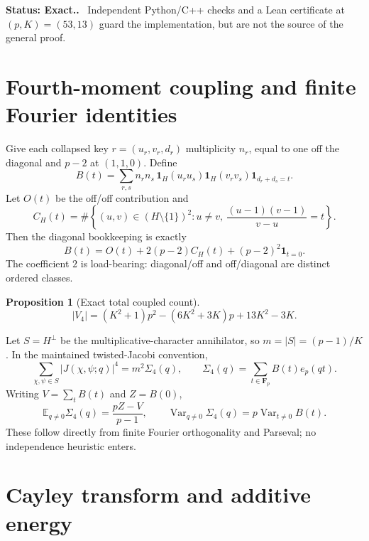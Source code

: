 \documentclass[11pt]{article}
\newtheorem{proposition}[theorem]{Proposition}
\newcommand{\Fp}{\mathbf F_p}
\newcommand{\Status}[1]{\par\smallskip\noindent\textbf{Status: #1.}\ }
\begin{document}
\Status{Exact.}  Independent Python/C++ checks and a Lean certificate at
$(p,K)=(53,13)$ guard the implementation, but are not the source of the general
proof.

\section{Fourth-moment coupling and finite Fourier identities}

Give each collapsed key $r=(u_r,v_r,d_r)$ multiplicity $n_r$, equal to one off
the diagonal and $p-2$ at $(1,1,0)$.  Define
\begin{equation}\label{eq:Bdef}
B(t)=\sum_{r,s}n_rn_s\,
\mathbf 1_H(u_ru_s)\mathbf 1_H(v_rv_s)\mathbf 1_{d_r+d_s=t}.
\end{equation}
Let $O(t)$ be the off/off contribution and
\[
C_H(t)=\#\left\{(u,v)\in(H\setminus\{1\})^2:
 u\ne v,\ \frac{(u-1)(v-1)}{v-u}=t\right\}.
\]
Then the diagonal bookkeeping is exactly
\begin{equation}\label{eq:Bdecomp}
B(t)=O(t)+2(p-2)C_H(t)+(p-2)^2\mathbf 1_{t=0}.
\end{equation}
The coefficient $2$ is load-bearing: diagonal/off and off/diagonal are distinct
ordered classes.

\begin{proposition}[Exact total coupled count]\label{prop:v4}
\[
|V_4|=(K^2+1)p^2-(6K^2+3K)p+13K^2-3K.
\]
\end{proposition}

Let $S=H^\perp$ be the multiplicative-character annihilator, so
$m=|S|=(p-1)/K$.  In the maintained twisted-Jacobi convention,
\begin{equation}\label{eq:fourier}
\sum_{\chi,\psi\in S}|J(\chi,\psi;q)|^4=m^2\Sigma_4(q),
\qquad
\Sigma_4(q)=\sum_{t\in\Fp}B(t)e_p(qt).
\end{equation}
Writing $V=\sum_tB(t)$ and $Z=B(0)$,
\begin{equation}\label{eq:meanvar}
\mathbb E_{q\ne0}\Sigma_4(q)=\frac{pZ-V}{p-1},
\qquad
\operatorname{Var}_{q\ne0}\Sigma_4(q)
=p\operatorname{Var}_{t\ne0}B(t).
\end{equation}
These follow directly from finite Fourier orthogonality and Parseval; no
independence heuristic enters.

\section{Cayley transform and additive energy}
\end{document}

